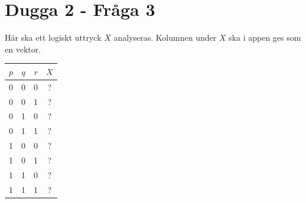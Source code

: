 \documentclass[a4paper,12pt]{article}
\begin{document}
\section{Dugga 2 - Fråga 3}
Här ska ett logiskt uttryck $X$ analyseras. Kolumnen under $X$ ska i appen ges
som en vektor.
\begin{center}
\begin{tabular}{ ccc | c } 
    $p$ & $q$ & $r$ & $X$ \\ 
    \hline
    0 & 0 & 0 & ? \\ 
    0 & 0 & 1 & ? \\ 
    0 & 1 & 0 & ? \\ 
    0 & 1 & 1 & ? \\ 
    1 & 0 & 0 & ? \\ 
    1 & 0 & 1 & ? \\ 
    1 & 1 & 0 & ? \\ 
    1 & 1 & 1 & ? \\ 
\end{tabular}
\end{center}
\end{document}

